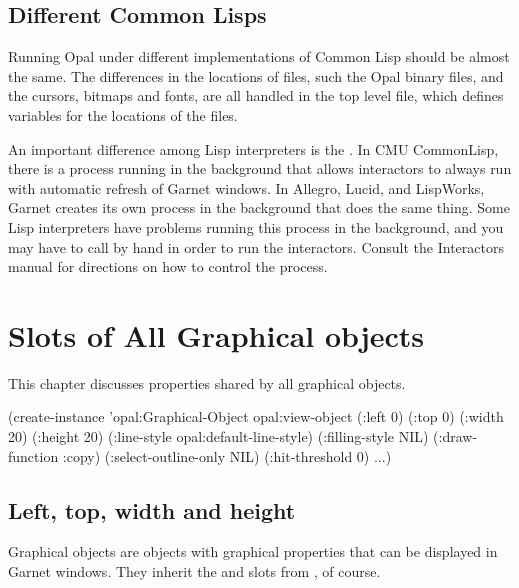 \section{Different Common Lisps}
Running Opal under different implementations of Common Lisp should be
almost the same.  The differences in the locations of files, such the
Opal binary files, and the cursors, bitmaps and fonts, are all handled in
the top level  file, which defines variables for the
locations of the files.

An important difference among Lisp interpreters is the .
In CMU CommonLisp, there is a process running in the background that
allows interactors to always run with automatic refresh of Garnet
windows.
In Allegro, Lucid, and LispWorks, Garnet creates its own 
process in the background that does the same thing.  Some Lisp
interpreters have problems running this process in the background,
and you may have to call  by hand in order
to run the interactors.  Consult the Interactors manual for directions
on how to control the  process.


\chapter{Slots of All Graphical objects}
This chapter discusses properties shared by all graphical objects.

\begin{programexample}


(create-instance 'opal:Graphical-Object opal:view-object
  (:left 0)   (:top 0)
  (:width 20) (:height 20)
  (:line-style opal:default-line-style)
  (:filling-style NIL)
  (:draw-function :copy)
  (:select-outline-only NIL)
  (:hit-threshold 0)
  ...)
\end{programexample}

\section{Left, top, width and height}
Graphical objects are objects with graphical properties that can be
displayed in Garnet windows.  They inherit the  and
 slots from , of course.

